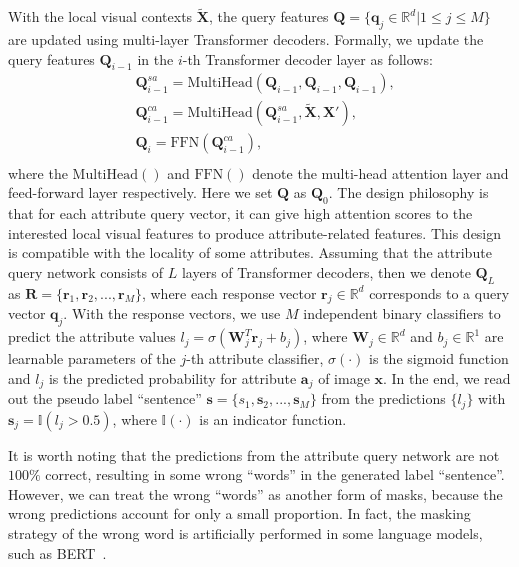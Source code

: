 \documentclass[runningheads]{llncs}
\begin{document}
With the local visual contexts $\bm{\widetilde{X}}$, the query features $\bm{Q} = \{\bm{q}_j \in \mathbb{R}^{d} |1 \le j \le M\}$ are updated using multi-layer Transformer decoders. Formally, we update the query features $\bm{Q}_{i-1}$ in the $i$-th Transformer decoder layer as follows:
\begin{equation}
  \begin{split}
    &\bm{Q}_{i-1}^{sa} = \mathrm{MultiHead}(\bm{Q}_{i-1},\bm{Q}_{i-1},\bm{Q}_{i-1}),\\
    &\bm{Q}_{i-1}^{ca} =  \mathrm{MultiHead}(\bm{Q}_{i-1}^{sa},\bm{\widetilde{X}},\bm{X}'),\\
    &\bm{Q}_{i} =  \mathrm{FFN}(\bm{Q}_{i-1}^{ca}),\\
  \end{split}
  \label{equ:attdecoder}
\end{equation}
where the $\mathrm{MultiHead}()$ and $\mathrm{FFN}()$ denote the multi-head attention layer and feed-forward layer respectively. Here we set $\bm{Q}$ as $\bm{Q}_0$.
The design philosophy is that for each attribute query vector, it can give high attention scores to the interested local visual features to produce attribute-related features. This design is compatible with the locality of some attributes. Assuming that the attribute query network consists of $L$ layers of Transformer decoders, then we denote $\bm{Q}_{L}$ as $\bm{R} = \{\bm{r}_{1}, \bm{r}_{2}, ..., \bm{r}_{M}\}$, where each response vector $\bm{r}_{j} \in \mathbb{R}^{d}$ corresponds to a query vector $\bm{q}_j$.
With the response vectors, we use $M$ independent binary classifiers to predict the attribute values $l_{j} = \sigma(\bm{W}_j^T \bm{r}_{j} + b_{j})$,
where $\bm{W}_j \in \mathbb{R}^d$ and $b_j \in \mathbb{R}^1$ are learnable parameters of the $j$-th attribute classifier, $\sigma(\cdot)$ is the sigmoid function and $l_{j}$ is the predicted probability for attribute $\bm{a}_j$ of image $\bm{x}$.
In the end, we read out the pseudo label ``sentence'' $\bm{s} = \{s_{1},\bm{s}_{2}, ..., \bm{s}_{M} \}$ from the predictions $\{l_{j}\}$ with $\bm{s}_{j} = \mathbb I (l_{j} > 0.5)$,
where $\mathbb I(\cdot)$ is an indicator function.


It is worth noting that the predictions from the attribute query network are not $100\%$ correct, resulting in some wrong ``words'' in the generated label ``sentence''. However, we can treat the wrong ``words'' as another form of masks, because the wrong predictions account for only a small proportion. In fact, the masking strategy of the wrong word is artificially performed in some language models, such as BERT~\cite{devlin2018bert}. 
\end{document}
